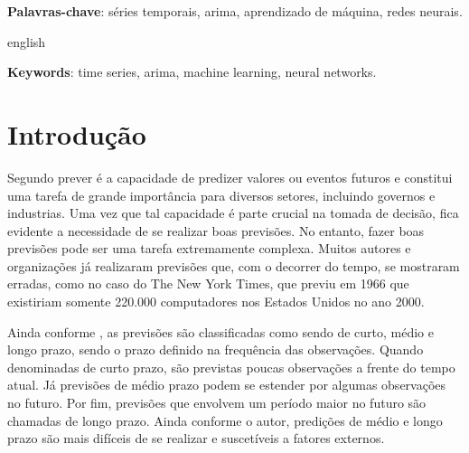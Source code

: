 \documentclass[
    12pt,
    oneside,
    a4paper,
    english,
    brazil
]{abntex2}
\begin{document}
\frenchspacing

\imprimircapa{}

\imprimirfolhaderosto{}

\begin{resumo}

    \textbf{Palavras-chave}: séries temporais, arima, aprendizado de máquina,
    redes neurais.
\end{resumo}

\begin{resumo}[Abstract]
    \begin{otherlanguage*}{english}

        \textbf{Keywords}: time series, arima, machine learning, neural
        networks.
    \end{otherlanguage*}
\end{resumo}

\textual{}

\tableofcontents*
\cleardoublepage{}

\chapter{Introdução}


Segundo  prever é a capacidade de predizer valores ou eventos futuros e constitui uma tarefa de grande importância para diversos setores, incluindo governos e
industrias. Uma vez que tal capacidade é parte crucial na tomada de decisão, fica evidente a necessidade de se realizar boas previsões. No entanto, fazer boas previsões pode ser uma tarefa extremamente complexa. Muitos autores e organizações já realizaram
previsões que, com o decorrer do tempo, se mostraram erradas, como no caso do The New
York Times, que previu em 1966 que existiriam somente 220.000 computadores nos Estados Unidos no ano 2000.

Ainda conforme , as previsões são classificadas como sendo de
curto, médio e longo prazo, sendo o prazo definido na frequência das
observações. Quando denominadas de curto prazo, são previstas poucas observações a frente do tempo atual. Já previsões de médio prazo podem se estender por algumas observações no futuro. Por fim, previsões que envolvem um período maior no futuro são chamadas de longo prazo. Ainda
conforme o autor, predições de médio e longo prazo são mais difíceis de se realizar e suscetíveis a fatores externos.
\end{document}
